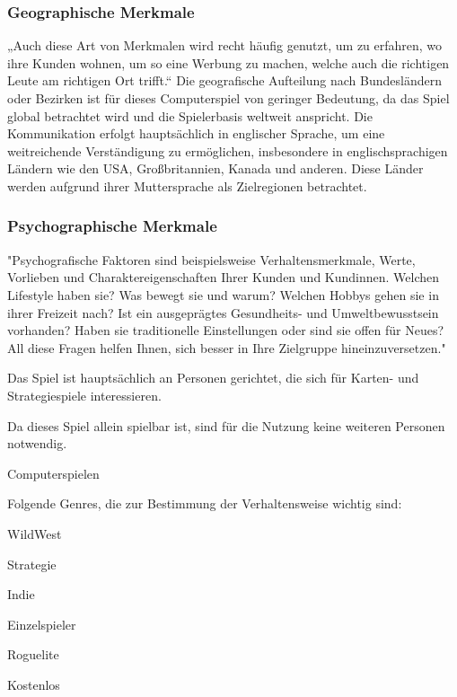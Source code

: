 \subsubsection{Geographische Merkmale}\label{subsubsec:Geographische-Merkmale}

„Auch diese Art von Merkmalen wird recht häufig genutzt, um zu erfahren, wo ihre Kunden wohnen, um so eine Werbung zu machen, welche auch die richtigen Leute am richtigen Ort trifft.“
Die geografische Aufteilung nach Bundesländern oder Bezirken ist für dieses Computerspiel von geringer Bedeutung, da das Spiel global betrachtet wird und die Spielerbasis weltweit anspricht.
Die Kommunikation erfolgt hauptsächlich in englischer Sprache, um eine weitreichende Verständigung zu ermöglichen, insbesondere in englischsprachigen Ländern wie den USA, Großbritannien, Kanada und anderen.
Diese Länder werden aufgrund ihrer Muttersprache als Zielregionen betrachtet.

\subsubsection{Psychographische Merkmale}\label{subsubsec:Psychographische-Merkmale}

"Psychografische Faktoren sind beispielsweise Verhaltensmerkmale, Werte, Vorlieben und Charaktereigenschaften Ihrer Kunden und Kundinnen. Welchen Lifestyle haben sie?
Was bewegt sie und warum?
Welchen Hobbys gehen sie in ihrer Freizeit nach?
Ist ein ausgeprägtes Gesundheits- und Umweltbewusstsein vorhanden?
Haben sie traditionelle Einstellungen oder
sind sie offen für Neues?
All diese Fragen helfen Ihnen, sich besser in Ihre Zielgruppe hineinzuversetzen." 

 Das Spiel ist hauptsächlich an Personen gerichtet, die sich für Karten- und Strategiespiele interessieren.

 Da dieses Spiel allein spielbar ist, sind für die Nutzung keine weiteren Personen notwendig.

 Computerspielen

Folgende Genres, die zur Bestimmung der Verhaltensweise wichtig sind:
\begin{liste}
    \item WildWest
    \item Strategie
    \item Indie
    \item Einzelspieler
    \item Roguelite
    \item Kostenlos
\end{liste}



